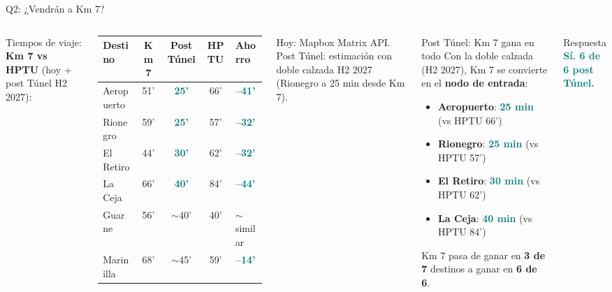 \documentclass[aspectratio=169, 11pt]{beamer}
\newcommand{\highlight}[1]{\textcolor{teal}{\textbf{#1}}}
\newcommand{\src}[1]{\par\vspace{2pt}{\tiny\textcolor{slate}{Fuente: #1}}}
\begin{document}
\begin{frame}{Q2: ¿Vendrán a Km 7?}

\begin{columns}[T]
\vspace{2pt}
{\small Tiempos de viaje: \textbf{Km 7 vs HPTU} (hoy + post Túnel H2 2027):}

\vspace{4pt}
{\scriptsize
\begin{tabular}{@{}lcccl@{}}
\toprule
\textbf{Destino} & \textbf{Km 7} & \textbf{Post Túnel} & \textbf{HPTU} & \textbf{Ahorro} \\
\midrule
\rowcolor{teal!10}
Aeropuerto & 51' & \highlight{25'} & 66' & \highlight{--41'} \\
\rowcolor{teal!10}
Rionegro & 59' & \highlight{25'} & 57' & \highlight{--32'} \\
\rowcolor{teal!10}
El Retiro & 44' & \highlight{30'} & 62' & \highlight{--32'} \\
\rowcolor{teal!10}
La Ceja & 66' & \highlight{40'} & 84' & \highlight{--44'} \\
Guarne & 56' & $\sim$40' & 40' & $\sim$similar \\
Marinilla & 68' & $\sim$45' & 59' & \highlight{--14'} \\
\bottomrule
\end{tabular}
}

\vspace{3pt}
{\tiny Hoy: Mapbox Matrix API. Post Túnel: estimación con doble calzada H2 2027 (Rionegro a 25 min desde Km 7).}

\vspace{3pt}
\src{Mapbox Matrix API, ANI/INVIAS proyección Túnel 2da etapa}

\vspace{2pt}
\begin{exampleblock}{\small Post Túnel: Km 7 gana en todo}
\footnotesize
Con la doble calzada (H2 2027), Km 7 se convierte en el \textbf{nodo de entrada}:

\vspace{3pt}
\begin{itemize}
  \item \textbf{Aeropuerto}: \highlight{25 min} (vs HPTU 66')
  \item \textbf{Rionegro}: \highlight{25 min} (vs HPTU 57')
  \item \textbf{El Retiro}: \highlight{30 min} (vs HPTU 62')
  \item \textbf{La Ceja}: \highlight{40 min} (vs HPTU 84')
\end{itemize}

\vspace{3pt}
Km 7 pasa de ganar en \textbf{3 de 7} destinos a ganar en \textbf{6 de 6}.
\end{exampleblock}

\vspace{4pt}
\begin{exampleblock}{\small Respuesta}
\centering\large
\highlight{Sí. 6 de 6 post Túnel.}
\end{exampleblock}
\end{columns}
\end{frame}
\end{document}
